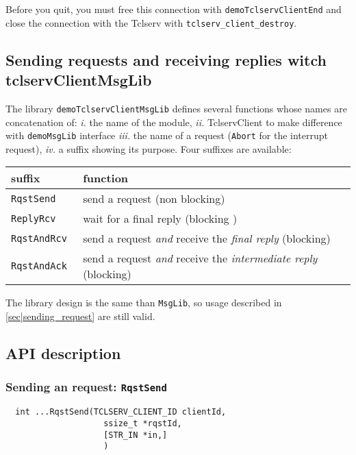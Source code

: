Before you  quit, you must  free this connection with \texttt{demoTclservClientEnd}
and close the connection with the Tclserv with \texttt{tclserv\_client\_destroy}.


\subsection{Sending requests and receiving replies witch tclservClientMsgLib}

The library \texttt{demoTclservClientMsgLib}  defines  several functions whose
names are concatenation of: \emph{i.} the name of the module, \emph{ii.}
TclservClient to make difference with \texttt{demoMsgLib} interface \emph{iii.}
the name of a request (\texttt{Abort} for the interrupt request),  \emph{iv.}
a  suffix showing its purpose. Four suffixes are available:

\begin{center}\small\begin{tabularx}{\linewidth}{|l|X|}
\hline
suffix & function \\
\hline
\tt RqstSend & send a request (non blocking) \\

\tt ReplyRcv & wait for a final reply (blocking )\\

\tt RqstAndRcv & send a request \emph{and} receive the \emph{final reply}
(blocking) \\

\tt RqstAndAck & send a request \emph{and} receive the \emph{intermediate reply}
(blocking) \\
\hline
\end{tabularx}\end{center}

The library design is the same than \texttt{MsgLib}, so usage described in
\ref{sec|sending_request} are still valid.

\subsection{API description}

\subsubsection{Sending an request: \texttt{RqstSend}}

\begin{center}\begin{cartouche}\small\begin{verbatim}
  int ...RqstSend(TCLSERV_CLIENT_ID clientId,
                    ssize_t *rqstId, 
                    [STR_IN *in,]
					)
\end{verbatim}\end{cartouche}\end{center}


